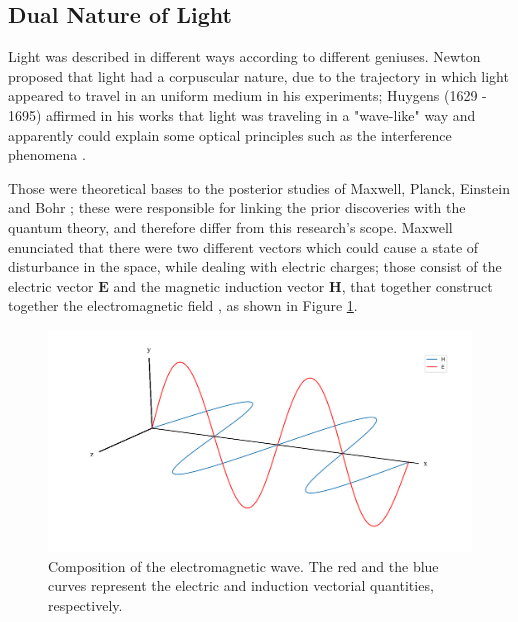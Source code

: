 \subsection{Dual Nature of Light}

Light was described in different ways according to different geniuses. Newton proposed that light had a corpuscular nature, due to the trajectory in which light appeared to travel in an uniform medium in his experiments; Huygens (1629 - 1695) affirmed in his works that light was traveling in a "wave-like" way and apparently could explain some optical principles such as the interference phenomena \cite{fowles1989introduction}.

Those were theoretical bases to the posterior studies of Maxwell, Planck, Einstein and Bohr \cite{fowles1989introduction}; these were responsible for linking the prior discoveries with the quantum theory, and therefore differ from this research's scope. Maxwell enunciated that there were two different vectors which could cause a state of disturbance in the space, while dealing with electric charges; those consist of the electric vector $\mathit{\mathbf{E}}$ and the magnetic induction vector $\mathit{\mathbf{H}}$, that together construct together the electromagnetic field \cite{born1999principles}, as shown in Figure \ref{fig:electromagnetic_wave}. 

\begin{figure}[htb]
	\centering
	\caption{\label{fig:electromagnetic_wave} 
		Composition of the electromagnetic wave. The red and the blue curves represent the electric and induction vectorial quantities, respectively.}
	\begin{center}
	    \includegraphics[scale=0.3]
			{images/fig2.png}
	\end{center}
	\centering
	\fautor
\end{figure}

